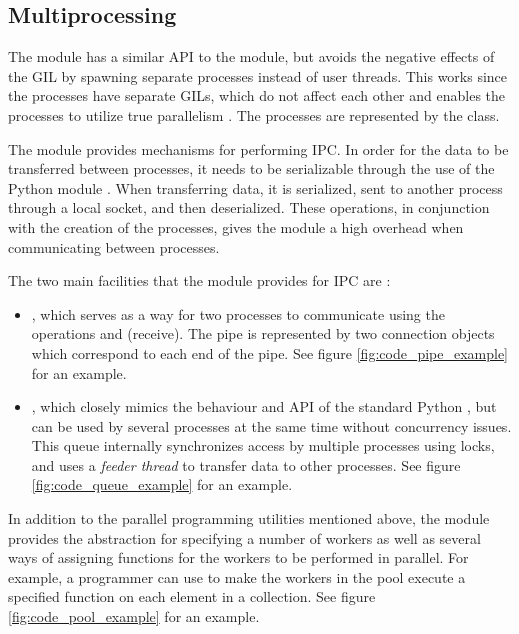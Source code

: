 \subsection{Multiprocessing}
The  module has a similar API to the  module, but avoids the negative effects of the GIL by spawning
separate processes instead of user threads. This works since the processes have separate GILs, which do not affect each other and
enables the processes to utilize true parallelism \cite{slatkin_2015_effective_ep5swtwbp}. The processes are represented by the  class.

The  module provides mechanisms for performing IPC.
In order for the data to be transferred between processes, it needs to be serializable through the use of the Python 
module \cite[p. 143]{slatkin_2015_effective_ep5swtwbp}. When transferring data, it is serialized, sent to another process through
a local socket, and then deserialized. These operations, in conjunction with the creation of the processes, gives the
 module a high overhead when communicating between processes.

The two main facilities that the  module provides for IPC are \cite{palach_2014_parallel_ppwp}:
\begin{itemize}
  \item {}, which serves as a way for two processes to communicate using the operations 
    and  (receive). The pipe is represented by two connection objects which correspond to each end of the pipe.
    See figure \ref{fig:code_pipe_example} for an example.
  \item {}, which closely mimics the behaviour and API of the standard Python , but
    can be used by several processes at the same time without concurrency issues. This  queue internally
    synchronizes access by multiple processes using locks, and uses a \emph{feeder thread} to transfer data to other processes.
    See figure \ref{fig:code_queue_example} for an example.
\end{itemize}

In addition to the parallel programming utilities mentioned above, the  module provides the  abstraction
for specifying a number of workers as well as several ways of assigning functions for the workers to be performed in parallel. For
example, a programmer can use  to make the workers in the pool execute a specified function on each element in a
collection.
See figure \ref{fig:code_pool_example} for an example.

